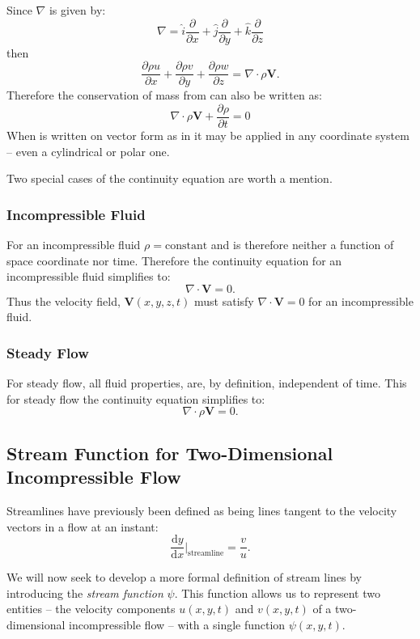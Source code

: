 Since $\nabla $ is given by:
\[ 
\nabla = \hat{i} \frac{\partial }{\partial x} + \hat{j} \frac{\partial }{\partial y} + \hat{k} \frac{\partial }{\partial z}
\]
then
\[ 
\frac{\partial \rho u}{\partial x} + \frac{\partial \rho v}{\partial y} + \frac{\partial \rho w}{\partial z} = \nabla \cdot \rho \textbf{V}
.\]
Therefore the conservation of mass from  can also be written as:
\begin{equation}\label{eq:coneqvec}
  \nabla \cdot \rho \textbf{V} + \frac{\partial \rho}{\partial t} = 0
\end{equation}
When  is written on vector form as in  it may be applied in any coordinate system -- even a cylindrical or polar one.

Two special cases of the continuity equation are worth a mention.

\subsubsection{Incompressible Fluid}
For an incompressible fluid $\rho = \mathrm{constant}$ and is therefore neither a function of space coordinate nor time. Therefore the continuity equation for an incompressible fluid simplifies to:
\[ 
  \nabla \cdot  \textbf{V} = 0
.\]
Thus the velocity field, $\textbf{V}(x,y,z,t)$ must satisfy $\nabla \cdot \textbf{V} = 0$ for an incompressible fluid.


\subsubsection{Steady Flow}
For steady flow, all fluid properties, are, by definition, independent of time. This for steady flow the continuity equation simplifies to:
\[ 
\nabla \cdot \rho \textbf{V} = 0
.\]


\subsection{Stream Function for Two-Dimensional Incompressible Flow}
Streamlines have previously been defined as being lines tangent to the velocity vectors in a flow at an instant:
\[ 
\frac{\mathrm{d}y}{\mathrm{d}x} \bigg|_{\mathrm{streamline}} = \frac{v}{u}
.\]

We will now seek to develop a more formal definition of stream lines by introducing the \textit{stream function} $\psi$. This function allows us to represent two entities -- the velocity components $u(x,y,t)$ and $v(x,y,t)$ of a two-dimensional incompressible flow -- with a single function $\psi(x,y,t)$.

